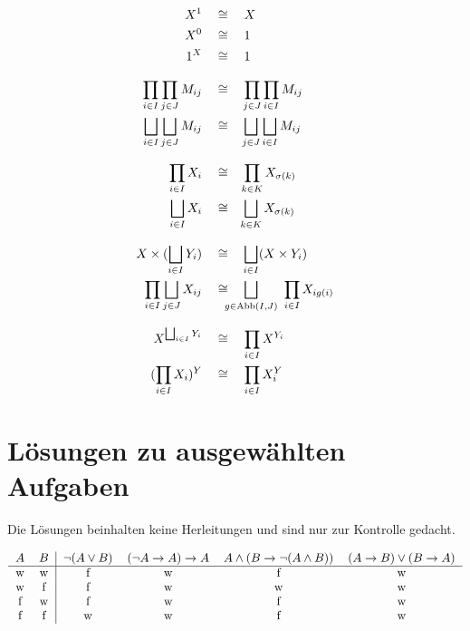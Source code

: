 \begin{align*}
    X^1 & \quad\cong\quad X \\
    X^0 & \quad\cong\quad 1 \\
    1^X & \quad\cong\quad 1 \\[0.8em]
    \prod_{i\in I} \prod_{j\in J} M_{ij} & \quad\cong\quad \smashoperator[l]{\prod_{j\in J}} \prod_{i\in I} M_{ij} \\
    \bigsqcup_{i\in I} \bigsqcup_{j\in J} M_{ij} & \quad\cong\quad \smashoperator[l]{\bigsqcup_{j\in J}} \bigsqcup_{i\in I} M_{ij}
    \\[0.8em]
    \prod_{i\in I} X_i & \quad\cong\quad \smashoperator[l]{\prod_{k\in K}} X_{\sigma(k)} \\
    \bigsqcup_{i\in I} X_i & \quad\cong\quad \smashoperator[l]{\bigsqcup_{k\in K}} X_{\sigma(k)} \\[0.8em]
    X \times (\bigsqcup_{i\in I} Y_i) & \quad\cong\quad \smashoperator[l]{\bigsqcup_{i\in I}} (X\times Y_i) \\
    \prod_{i\in I} \bigsqcup_{j\in J} X_{ij} & \quad\cong\quad \smashoperator[l]{\bigsqcup_{g\in \Abb(I,J)}}\ \prod_{i\in I} X_{ig(i)} \\[0.8em]
    X^{\bigsqcup_{i\in I} Y_i} & \quad\cong\quad \smashoperator[l]{\prod_{i\in I}} X^{Y_i} \\
    (\prod_{i\in I} X_i)^Y & \quad\cong\quad \smashoperator[l]{\prod_{i\in I}} X_i^Y
\end{align*}
\endgroup





\chapter{Lösungen zu ausgewählten Aufgaben} \label{anhang:loesungen}


Die Lösungen beinhalten keine Herleitungen und sind nur zur Kontrolle gedacht.


\begin{loes} \quad
    \[ \begin{tabular}{cc|cccc}
        $A$ & $B$  & $\neg(A\lor B)$ & $(\neg A \to A) \to A$ & $A\land(B\to\neg(A\land B))$ & $(A\to B)\lor(B\to A)$ \\
        \hline
        w&w& f & w & f & w \\
        w&f& f & w & w & w \\
        f&w& f & w & f & w \\
        f&f& w & w & f & w
    \end{tabular} \]
\end{loes}


